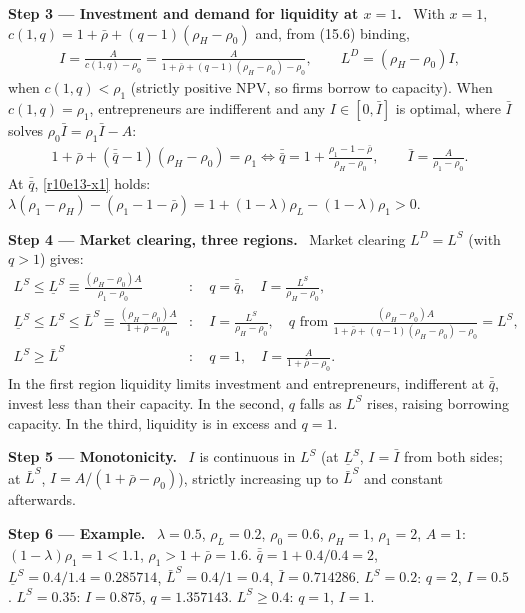 \documentclass[11pt,a4paper]{article}
\newcommand{\step}[2]{\par\medskip\noindent\textbf{Step #1 --- #2.}~}
\begin{document}
\step{3}{Investment and demand for liquidity at $x=1$} With $x=1$, $c(1,q)=1+\bar\rho+(q-1)(\rho_H-\rho_0)$ and, from (15.6) binding,
\begin{align}
  I = \frac{A}{c(1,q)-\rho_0} = \frac{A}{1+\bar\rho+(q-1)(\rho_H-\rho_0)-\rho_0}, \qquad L^D=(\rho_H-\rho_0)I, \label{r10e13-I}
\end{align}
when $c(1,q)<\rho_1$ (strictly positive NPV, so firms borrow to capacity). When $c(1,q)=\rho_1$, entrepreneurs are indifferent and any $I\in[0,\bar I]$ is optimal, where $\bar I$ solves $\rho_0\bar I=\rho_1\bar I-A$:
\begin{align}
  1+\bar\rho+(\bar{\bar q}-1)(\rho_H-\rho_0)=\rho_1 \iff \bar{\bar q}=1+\frac{\rho_1-1-\bar\rho}{\rho_H-\rho_0}, \qquad \bar I=\frac{A}{\rho_1-\rho_0}. \label{r10e13-qq}
\end{align}
At $\bar{\bar q}$, \eqref{r10e13-x1} holds: $\lambda(\rho_1-\rho_H)-(\rho_1-1-\bar\rho)=1+(1-\lambda)\rho_L-(1-\lambda)\rho_1>0$.

\step{4}{Market clearing, three regions} Market clearing $L^D=L^S$ (with $q>1$) gives:
\begin{align}
  L^S\leq\underline L^S\equiv\frac{(\rho_H-\rho_0)A}{\rho_1-\rho_0}&: \quad q=\bar{\bar q},\quad I=\frac{L^S}{\rho_H-\rho_0}, \label{r10e13-r1}\\
  \underline L^S\leq L^S\leq\bar L^S\equiv\frac{(\rho_H-\rho_0)A}{1+\bar\rho-\rho_0}&: \quad I=\frac{L^S}{\rho_H-\rho_0},\quad q \text{ from } \frac{(\rho_H-\rho_0)A}{1+\bar\rho+(q-1)(\rho_H-\rho_0)-\rho_0}=L^S, \label{r10e13-r2}\\
  L^S\geq\bar L^S&: \quad q=1,\quad I=\frac{A}{1+\bar\rho-\rho_0}. \label{r10e13-r3}
\end{align}
In the first region liquidity limits investment and entrepreneurs, indifferent at $\bar{\bar q}$, invest less than their capacity. In the second, $q$ falls as $L^S$ rises, raising borrowing capacity. In the third, liquidity is in excess and $q=1$.

\step{5}{Monotonicity} $I$ is continuous in $L^S$ (at $\underline L^S$, $I=\bar I$ from both sides; at $\bar L^S$, $I=A/(1+\bar\rho-\rho_0)$), strictly increasing up to $\bar L^S$ and constant afterwards.

\step{6}{Example} $\lambda=0.5$, $\rho_L=0.2$, $\rho_0=0.6$, $\rho_H=1$, $\rho_1=2$, $A=1$: $(1-\lambda)\rho_1=1<1.1$, $\rho_1>1+\bar\rho=1.6$. $\bar{\bar q}=1+0.4/0.4=2$, $\underline L^S=0.4/1.4=0.285714$, $\bar L^S=0.4/1=0.4$, $\bar I=0.714286$. $L^S=0.2$: $q=2$, $I=0.5$. $L^S=0.35$: $I=0.875$, $q=1.357143$. $L^S\geq0.4$: $q=1$, $I=1$.
\end{document}
